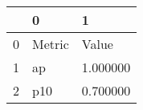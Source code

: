 \begin{tabular}{lll}
\toprule
 & 0 & 1 \\
\midrule
0 & Metric & Value \\
1 & ap & 1.000000 \\
2 & p10 & 0.700000 \\
\bottomrule
\end{tabular}
